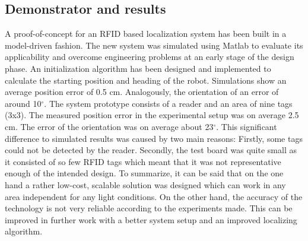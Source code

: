 \subsection*{Demonstrator and results}
A proof-of-concept for an RFID based localization system has been built in a model-driven fashion. The new system was simulated using Matlab to evaluate its applicability and overcome engineering problems at an early stage of the design phase. An initialization algorithm has been designed and implemented to calculate the starting position and heading of the robot.  Simulations show an average position error of 0.5 cm. Analogously, the orientation of an error of around 10$^{\circ}$. The system prototype consists of a reader and an area of nine tags (3x3).  The measured position error in the experimental setup was on average 2.5 cm. The error of the orientation was on average about 23$^{\circ}$. This significant difference to simulated results was caused by two main reasons: Firstly, some tags could not be detected by the reader. Secondly, the test board was quite small as it consisted of so few RFID tags which meant that it was not representative enough of the intended design. To summarize, it can be said that on the one hand a rather low-cost, scalable solution was designed which can work in any area independent for any light conditions.  On the other hand, the accuracy of the technology is not very reliable according to the experiments made. This can be improved in further work with a better system setup and an improved localizing algorithm.

